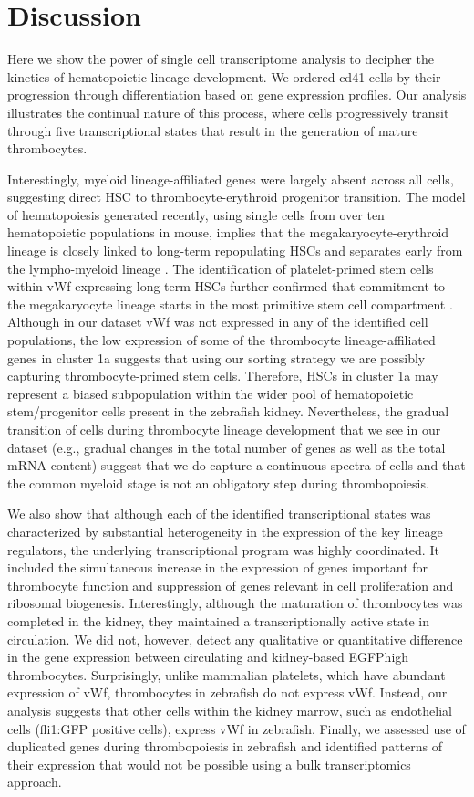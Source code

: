 \section{Discussion}

Here we show the power of single cell transcriptome analysis to decipher the kinetics of hematopoietic lineage development. We ordered cd41 cells by their progression through differentiation based on gene expression profiles. Our analysis illustrates the continual nature of this process, where cells progressively transit through five transcriptional states that result in the generation of mature thrombocytes.

Interestingly, myeloid lineage-affiliated genes were largely absent across all cells, suggesting direct HSC to thrombocyte-erythroid progenitor transition. The model of hematopoiesis generated recently, using single cells from over ten hematopoietic populations in mouse, implies that the megakaryocyte-erythroid lineage is closely linked to long-term repopulating HSCs and separates early from the lympho-myeloid lineage \cite{Guo2013-si}. The identification of platelet-primed stem cells within vWf-expressing long-term HSCs further confirmed that commitment to the megakaryocyte lineage starts in the most primitive stem cell compartment \cite{Sanjuan-Pla2013-qs}. Although in our dataset vWf was not expressed in any of the identified cell populations, the low expression of some of the thrombocyte lineage-affiliated genes in cluster 1a suggests that using our sorting strategy we are possibly capturing thrombocyte-primed stem cells. Therefore, HSCs in cluster 1a may represent a biased subpopulation within the wider pool of hematopoietic stem/progenitor cells present in the zebrafish kidney. Nevertheless, the gradual transition of cells during thrombocyte lineage development that we see in our dataset (e.g., gradual changes in the total number of genes as well as the total mRNA content) suggest that we do capture a continuous spectra of cells and that the common myeloid stage is not an obligatory step during thrombopoiesis.

We also show that although each of the identified transcriptional states was characterized by substantial heterogeneity in the expression of the key lineage regulators, the underlying transcriptional program was highly coordinated. It included the simultaneous increase in the expression of genes important
for thrombocyte function and suppression of genes relevant in cell proliferation and ribosomal biogenesis. Interestingly, although the maturation of thrombocytes was completed in the kidney, they maintained a transcriptionally active state in circulation. We did not, however, detect any qualitative or quantitative difference in the gene expression between circulating and kidney-based EGFPhigh thrombocytes. Surprisingly, unlike mammalian platelets, which have abundant expression of vWf, thrombocytes in zebrafish do not express vWf. Instead, our analysis suggests that other cells within the kidney marrow, such as endothelial cells (fli1:GFP positive cells), express vWf in zebrafish. Finally, we assessed use of duplicated genes during thrombopoiesis in zebrafish and identified patterns of their expression that would not be possible using a bulk transcriptomics approach.

